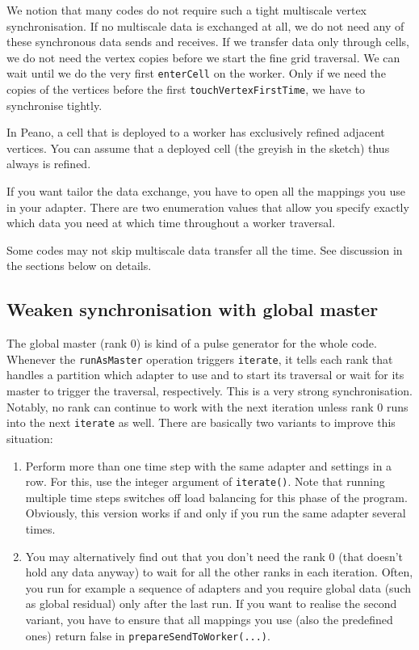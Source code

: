 We notion that many codes do not require such a tight multiscale vertex
synchronisation.
If no multiscale data is exchanged at all, we do not need any of these
synchronous data sends and receives.
If we transfer data only through cells, we do not need the vertex copies before
we start the fine grid traversal.
We can wait until we do the very first \texttt{enterCell} on the worker.
Only if we need the copies of the vertices before the first
\texttt{touchVertexFirstTime}, we have to synchronise tightly.


\begin{remark}
In Peano, a cell that is deployed to a worker has exclusively refined adjacent
vertices. 
You can assume that a deployed cell (the greyish in the sketch) thus always is
refined.
\end{remark}


If you want tailor the data exchange, you have to open all the mappings you use
in your adapter.
There are two enumeration values that allow you specify exactly which data you
need at which time throughout a worker traversal.


\begin{remark}
Some codes may not skip multiscale data transfer all the time. See discussion in
the sections below on details.
\end{remark}


\subsection{Weaken synchronisation with global master}

The global master (rank 0) is kind of a pulse generator for the whole code. 
Whenever the \texttt{runAsMaster} operation triggers \texttt{iterate}, it tells
each rank that handles a partition which adapter to use and to start its
traversal or wait for its master to trigger the traversal, respectively.
This is a very strong synchronisation.
Notably, no rank can continue to work with the next iteration unless rank 0 runs
into the next \texttt{iterate} as well.
There are basically two variants to improve this situation:

\begin{enumerate}
  \item Perform more than one time step with the same adapter and settings in a
  row. For this, use the integer argument of \texttt{iterate()}. Note that
  running multiple time steps switches off load balancing for this phase of the program.
  Obviously, this version works if and only if you run the same adapter several 
  times.
  \item You may alternatively find out that you don't need the rank 0 (that
  doesn't hold any data anyway) to wait for all the other ranks in each
  iteration. Often, you run for example a sequence of adapters and you require
  global data (such as global residual) only after the last run. 
  If you want to realise the second variant, you have to ensure that all
  mappings you use (also the predefined ones) return false in
  \texttt{prepareSendToWorker(...)}.
\end{enumerate}



